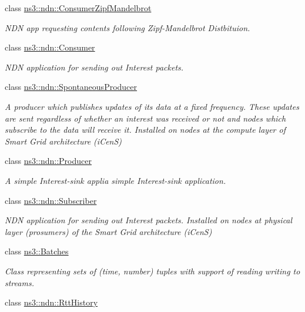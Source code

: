 \begin{DoxyCompactItemize}
class \hyperlink{classns3_1_1ndn_1_1ConsumerZipfMandelbrot}{ns3\+::ndn\+::\+Consumer\+Zipf\+Mandelbrot}
\begin{DoxyCompactList}\small\item\em N\+DN app requesting contents following Zipf-\/\+Mandelbrot Distbituion. \end{DoxyCompactList}\item 
class \hyperlink{classns3_1_1ndn_1_1Consumer}{ns3\+::ndn\+::\+Consumer}
\begin{DoxyCompactList}\small\item\em N\+DN application for sending out Interest packets. \end{DoxyCompactList}\item 
class \hyperlink{classns3_1_1ndn_1_1SpontaneousProducer}{ns3\+::ndn\+::\+Spontaneous\+Producer}
\begin{DoxyCompactList}\small\item\em A producer which publishes updates of its data at a fixed frequency. These updates are sent regardless of whether an interest was received or not and nodes which subscribe to the data will receive it. Installed on nodes at the compute layer of Smart Grid architecture (i\+CenS) \end{DoxyCompactList}\item 
class \hyperlink{classns3_1_1ndn_1_1Producer}{ns3\+::ndn\+::\+Producer}
\begin{DoxyCompactList}\small\item\em A simple Interest-\/sink applia simple Interest-\/sink application. \end{DoxyCompactList}\item 
class \hyperlink{classns3_1_1ndn_1_1Subscriber}{ns3\+::ndn\+::\+Subscriber}
\begin{DoxyCompactList}\small\item\em N\+DN application for sending out Interest packets. Installed on nodes at physical layer (prosumers) of the Smart Grid architecture (i\+CenS) \end{DoxyCompactList}\item 
class \hyperlink{classns3_1_1Batches}{ns3\+::\+Batches}
\begin{DoxyCompactList}\small\item\em Class representing sets of (time, number) tuples with support of reading writing to streams. \end{DoxyCompactList}\item 
class \hyperlink{classns3_1_1ndn_1_1RttHistory}{ns3\+::ndn\+::\+Rtt\+History}

\end{DoxyCompactItemize}
